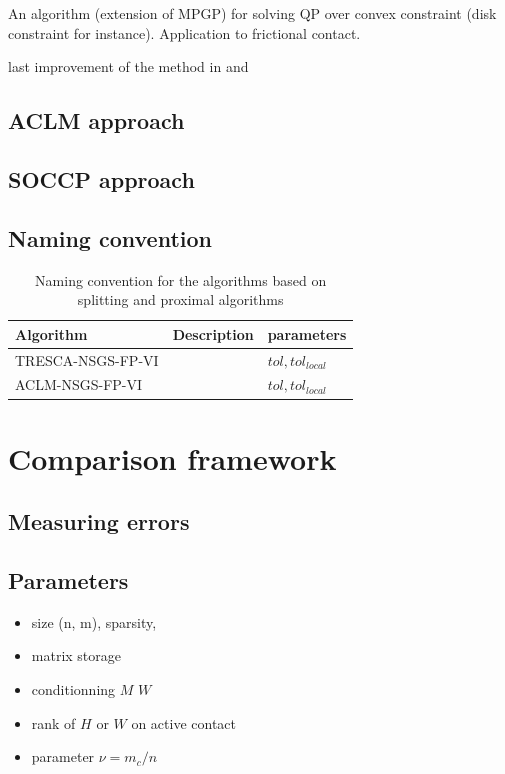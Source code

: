 \cite{Dostal.Kozubek_MP2012} An algorithm (extension of MPGP) for solving QP over convex constraint (disk constraint for instance). Application to frictional contact. 


\cite{Dostal.Kucera_SIOPT2010} last improvement of the method in \cite{Dostal.Kozubek_MP2012} and \cite{Kucera_SIOPT2008}




\subsection{ACLM approach}

\subsection{SOCCP approach}


\subsection{Naming convention}

\begin{table}
  \centering
  \begin{tabular}{|l|p{}|l|}
    \hline
    { Algorithm}
    & Description 
    & parameters\\
    \hline
    \sf TRESCA-NSGS-FP-VI
    & 
    & $tol, tol_{local}$\\
    \hline
    \sf ACLM-NSGS-FP-VI
    & 
    & $tol, tol_{local}$\\
    \hline
    \hline
  \end{tabular}
  \caption{Naming convention for the algorithms based on splitting and proximal algorithms}
  \label{tab:SPLIT-PROX-algos}
\end{table}


\section{Comparison framework}
\label{sec:numericalcomparisons}
\subsection{Measuring errors}
\label{Sec:MeasuringErrors}

\subsection{Parameters}

\begin{itemize}
\item size (n, m), sparsity,
\item matrix storage
\item conditionning $M$ $W$
\item rank of $H$ or $W$ on active contact
\item parameter $\nu = m_c/n$
\end{itemize}

